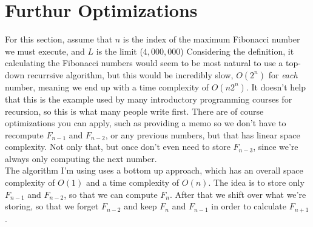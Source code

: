 \documentclass[11pt, oneside]{article}   	%
\begin{document}
\section{Furthur Optimizations}
	For this section, assume that $n$ is the index of the maximum Fibonacci number we must execute, and $L$ is the limit ($4,000,000$)
	Considering the definition, it calculating the Fibonacci numbers would seem to be most natural to use a top-down recurrsive algorithm, but this would be incredibly slow, $O(2^n)$ for \textit{each} number, meaning we end up with a time complexity of $O(n2^n)$. It doesn't help that this is the example used by many introductory programming courses for recursion, so this is what many people write first. There are of course optimizations you can apply, such as providing a memo so we don't have to recompute $F_{n-1}$ and $F_{n-2}$, or any previous numbers, but that has linear space complexity. Not only that, but once don't even need to store $F_{n-3}$, since we're always only computing the next number.\\
	The algorithm I'm using uses a bottom up approach, which has an overall space complexity of $O(1)$ and a time complexity of $O(n)$. The idea is to store only $F_{n-1}$ and $F_{n-2}$, so that we can compute $F_n$. After that we shift over what we're storing, so that we forget $F_{n-2}$ and keep $F_n$ and $F_{n-1}$ in order to calculate $F_{n+1}$.
\end{document}
